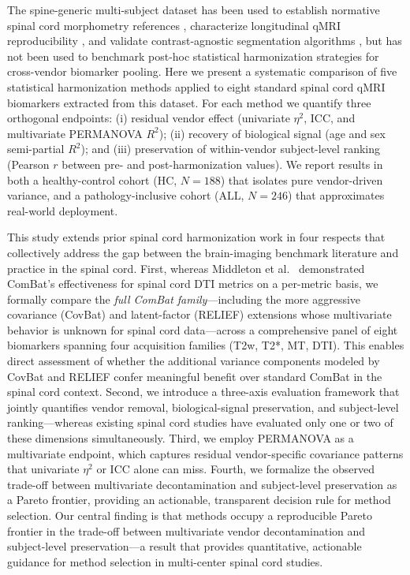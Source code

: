 \documentclass[12pt,a4paper]{article}
\begin{document}
The spine-generic multi-subject dataset \cite{cohen2021opena,cohen2021generic} has been used to establish normative spinal cord morphometry references \cite{valosek2024morphometry}, characterize longitudinal qMRI reproducibility \cite{boudreau2025longitudinal}, and validate contrast-agnostic segmentation algorithms \cite{bedard2025contrast}, but has not been used to benchmark post-hoc statistical harmonization strategies for cross-vendor biomarker pooling. Here we present a systematic comparison of five statistical harmonization methods applied to eight standard spinal cord qMRI biomarkers extracted from this dataset. For each method we quantify three orthogonal endpoints: (i) residual vendor effect (univariate $\eta^2$, ICC, and multivariate PERMANOVA $R^2$); (ii) recovery of biological signal (age and sex semi-partial $R^2$); and (iii) preservation of within-vendor subject-level ranking (Pearson $r$ between pre- and post-harmonization values). We report results in both a healthy-control cohort (HC, $N=188$) that isolates pure vendor-driven variance, and a pathology-inclusive cohort (ALL, $N=246$) that approximates real-world deployment.

This study extends prior spinal cord harmonization work in four respects that collectively address the gap between the brain-imaging benchmark literature and practice in the spinal cord. First, whereas Middleton et al.\ \cite{middleton2023spinal} demonstrated ComBat's effectiveness for spinal cord DTI metrics on a per-metric basis, we formally compare the \emph{full ComBat family}---including the more aggressive covariance (CovBat) and latent-factor (RELIEF) extensions whose multivariate behavior is unknown for spinal cord data---across a comprehensive panel of eight biomarkers spanning four acquisition families (T2w, T2*, MT, DTI). This enables direct assessment of whether the additional variance components modeled by CovBat and RELIEF confer meaningful benefit over standard ComBat in the spinal cord context. Second, we introduce a three-axis evaluation framework that jointly quantifies vendor removal, biological-signal preservation, and subject-level ranking---whereas existing spinal cord studies have evaluated only one or two of these dimensions simultaneously. Third, we employ PERMANOVA as a multivariate endpoint, which captures residual vendor-specific covariance patterns that univariate $\eta^2$ or ICC alone can miss. Fourth, we formalize the observed trade-off between multivariate decontamination and subject-level preservation as a Pareto frontier, providing an actionable, transparent decision rule for method selection. Our central finding is that methods occupy a reproducible Pareto frontier in the trade-off between multivariate vendor decontamination and subject-level preservation---a result that provides quantitative, actionable guidance for method selection in multi-center spinal cord studies.
\end{document}
